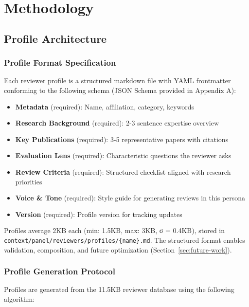 \section{Methodology}

\subsection{Profile Architecture}

\subsubsection{Profile Format Specification}

Each reviewer profile is a structured markdown file with YAML frontmatter conforming to the following schema (JSON Schema provided in Appendix A):

\begin{itemize}
\item \textbf{Metadata} (required): Name, affiliation, category, keywords
\item \textbf{Research Background} (required): 2-3 sentence expertise overview
\item \textbf{Key Publications} (required): 3-5 representative papers with citations
\item \textbf{Evaluation Lens} (required): Characteristic questions the reviewer asks
\item \textbf{Review Criteria} (required): Structured checklist aligned with research priorities
\item \textbf{Voice \& Tone} (required): Style guide for generating reviews in this persona
\item \textbf{Version} (required): Profile version for tracking updates
\end{itemize}

Profiles average 2KB each (min: 1.5KB, max: 3KB, σ = 0.4KB), stored in \texttt{context/panel/reviewers/profiles/\{name\}.md}. The structured format enables validation, composition, and future optimization (Section~\ref{sec:future-work}).

\subsubsection{Profile Generation Protocol}

Profiles are generated from the 11.5KB reviewer database using the following algorithm:

